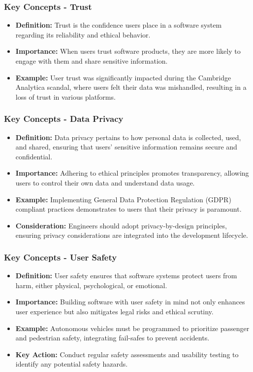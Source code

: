 \documentclass{beamer}
\begin{document}
\begin{frame}[fragile]
    \frametitle{Key Concepts - Trust}
    \begin{itemize}
        \item \textbf{Definition:} 
        Trust is the confidence users place in a software system regarding its reliability and ethical behavior.
        \item \textbf{Importance:} 
        When users trust software products, they are more likely to engage with them and share sensitive information.
        \item \textbf{Example:} 
        User trust was significantly impacted during the Cambridge Analytica scandal, where users felt their data was mishandled, resulting in a loss of trust in various platforms.
    \end{itemize}
\end{frame}

\begin{frame}[fragile]
    \frametitle{Key Concepts - Data Privacy}
    \begin{itemize}
        \item \textbf{Definition:} 
        Data privacy pertains to how personal data is collected, used, and shared, ensuring that users' sensitive information remains secure and confidential.
        \item \textbf{Importance:} 
        Adhering to ethical principles promotes transparency, allowing users to control their own data and understand data usage.
        \item \textbf{Example:} 
        Implementing General Data Protection Regulation (GDPR) compliant practices demonstrates to users that their privacy is paramount.
        \item \textbf{Consideration:} 
        Engineers should adopt privacy-by-design principles, ensuring privacy considerations are integrated into the development lifecycle.
    \end{itemize}
\end{frame}

\begin{frame}[fragile]
    \frametitle{Key Concepts - User Safety}
    \begin{itemize}
        \item \textbf{Definition:} 
        User safety ensures that software systems protect users from harm, either physical, psychological, or emotional.
        \item \textbf{Importance:} 
        Building software with user safety in mind not only enhances user experience but also mitigates legal risks and ethical scrutiny.
        \item \textbf{Example:} 
        Autonomous vehicles must be programmed to prioritize passenger and pedestrian safety, integrating fail-safes to prevent accidents.
        \item \textbf{Key Action:} 
        Conduct regular safety assessments and usability testing to identify any potential safety hazards.
    \end{itemize}
\end{frame}
\end{document}
